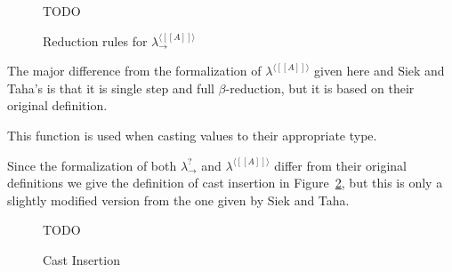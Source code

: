 \begin{figure}
  TODO
  \caption{Reduction rules for $\lambda^{\langle [[A]] \rangle}_\to$}
  \label{fig:annotated-reduction}
\end{figure}

The major difference from the formalization of $\lambda^{\langle [[A]]
  \rangle}$ given here and Siek and Taha's is that it is single step
and full $\beta$-reduction, but it is based on their original
definition. 

This function is used when casting values to their appropriate type.

Since the formalization of both $\lambda^?_\to$ and $\lambda^{\langle
  [[A]] \rangle}$ differ from their original definitions we give the
definition of cast insertion in Figure~\ref{fig:cast-insert}, but this
is only a slightly modified version from the one given by Siek and
Taha.
\begin{figure}
  TODO
  \caption{Cast Insertion}
  \label{fig:cast-insert}
\end{figure}


